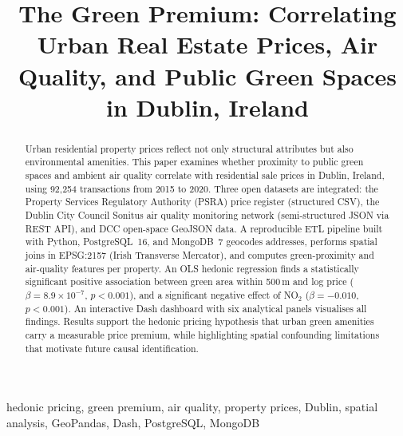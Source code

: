 \documentclass[conference]{IEEEtran}
\begin{document}
\title{The Green Premium: Correlating Urban Real Estate Prices,
Air Quality, and Public Green Spaces in Dublin, Ireland}

\author{
  \and
  \and
}

\maketitle

\begin{abstract}
Urban residential property prices reflect not only structural attributes but
also environmental amenities. This paper examines whether proximity to public
green spaces and ambient air quality correlate with residential sale prices
in Dublin, Ireland, using 92{,}254 transactions from 2015 to 2020.
Three open datasets are integrated: the Property Services Regulatory Authority
(PSRA) price register (structured CSV), the Dublin City Council Sonitus air
quality monitoring network (semi-structured JSON via REST API), and DCC
open-space GeoJSON data. A reproducible ETL pipeline built with Python,
PostgreSQL~16, and MongoDB~7 geocodes addresses, performs spatial joins in
EPSG:2157 (Irish Transverse Mercator), and computes green-proximity and
air-quality features per property. An OLS hedonic regression finds a
statistically significant positive association between green area within
500\,m and log price ($\beta = 8.9 \times 10^{-7}$, $p<0.001$), and a
significant negative effect of NO$_2$ ($\beta = -0.010$, $p<0.001$).
An interactive Dash dashboard with six analytical panels visualises all
findings. Results support the hedonic pricing hypothesis that urban green
amenities carry a measurable price premium, while highlighting spatial
confounding limitations that motivate future causal identification.
\end{abstract}

\begin{IEEEkeywords}
hedonic pricing, green premium, air quality, property prices, Dublin, spatial
analysis, GeoPandas, Dash, PostgreSQL, MongoDB
\end{IEEEkeywords}
\end{document}
